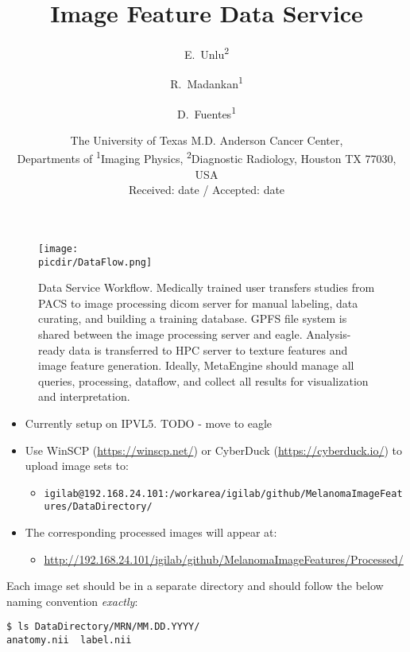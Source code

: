 \documentclass[10pt]{amsart}
\title{Image Feature Data Service}
\author{
        E.~Unlu\textsuperscript{2} \and
        R.~Madankan\textsuperscript{1}\and 
        D.~Fuentes\textsuperscript{1} 
}
\date{ \small
The University of Texas M.D. Anderson Cancer Center,\\
Departments of \textsuperscript{1}Imaging Physics, \textsuperscript{2}Diagnostic Radiology,
Houston TX 77030, USA \\
Received: date / Accepted: date
}
\newcommand{\picdir}{./pdffig}
\begin{document}
\maketitle

\begin{figure}[h]
\texttt{[image: \\picdir/DataFlow.png]}
\caption{
Data Service Workflow.
Medically trained user transfers studies from PACS to image 
processing dicom server for manual labeling, data curating, and building a training database.
GPFS file system is shared between the image processing server and eagle.
Analysis-ready data is transferred to HPC server to texture features and image feature generation.
Ideally, MetaEngine should manage all queries, processing, dataflow, 
and collect all results for visualization and interpretation.
}\label{Fig:DataFlow}
\end{figure}

\begin{itemize}
\item Currently setup on IPVL5. TODO - move to eagle
\item
Use WinSCP (\href{https://winscp.net/}{https://winscp.net/})
or CyberDuck (\href{https://cyberduck.io/}{https://cyberduck.io/})
to upload image sets to:
\begin{itemize}
\item
\texttt{igilab@192.168.24.101:/workarea/igilab/github/MelanomaImageFeatures/DataDirectory/}
\end{itemize}

\item
The corresponding processed images will appear at:
\begin{itemize}
\item
\href{http://192.168.24.101/igilab/github/MelanomaImageFeatures/Processed/}{http://192.168.24.101/igilab/github/MelanomaImageFeatures/Processed/}
\end{itemize}
\end{itemize}


Each image set should be in a separate directory and should follow
the below naming convention \textit{exactly}:
\begin{verbatim}
$ ls DataDirectory/MRN/MM.DD.YYYY/
anatomy.nii  label.nii
\end{verbatim}
\end{document}
